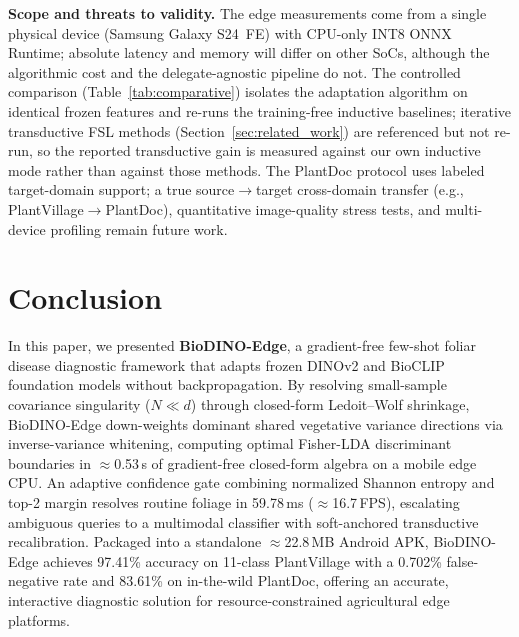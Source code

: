 \documentclass[preprint,12pt]{elsarticle}
\begin{document}
\textbf{Scope and threats to validity.} The edge measurements come from a single physical device (Samsung Galaxy S24~FE) with CPU-only INT8 ONNX Runtime; absolute latency and memory will differ on other SoCs, although the algorithmic cost and the delegate-agnostic pipeline do not. The controlled comparison (Table~\ref{tab:comparative}) isolates the adaptation algorithm on identical frozen features and re-runs the training-free inductive baselines; iterative transductive FSL methods (Section~\ref{sec:related_work}) are referenced but not re-run, so the reported transductive gain is measured against our own inductive mode rather than against those methods. The PlantDoc protocol uses labeled target-domain support; a true source$\rightarrow$target cross-domain transfer (e.g., PlantVillage$\rightarrow$PlantDoc), quantitative image-quality stress tests, and multi-device profiling remain future work.

\section{Conclusion}
\label{sec:conclusion}
In this paper, we presented \textbf{BioDINO-Edge}, a gradient-free few-shot foliar disease diagnostic framework that adapts frozen DINOv2 and BioCLIP foundation models without backpropagation. By resolving small-sample covariance singularity ($N \ll d$) through closed-form Ledoit--Wolf shrinkage, BioDINO-Edge down-weights dominant shared vegetative variance directions via inverse-variance whitening, computing optimal Fisher-LDA discriminant boundaries in $\approx$0.53\,s of gradient-free closed-form algebra on a mobile edge CPU. An adaptive confidence gate combining normalized Shannon entropy and top-2 margin resolves routine foliage in 59.78\,ms ($\approx$16.7\,FPS), escalating ambiguous queries to a multimodal classifier with soft-anchored transductive recalibration. Packaged into a standalone $\approx$22.8\,MB Android APK, BioDINO-Edge achieves 97.41\% accuracy on 11-class PlantVillage with a 0.702\% false-negative rate and 83.61\% on in-the-wild PlantDoc, offering an accurate, interactive diagnostic solution for resource-constrained agricultural edge platforms.

\appendix
\end{document}
